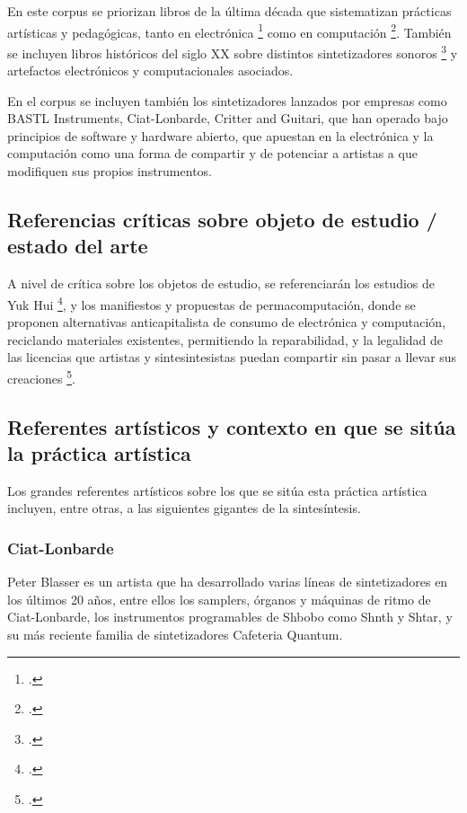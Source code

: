 \documentclass[../proyecto.tex]{subfiles}
\begin{document}
En este corpus se priorizan libros de la última década que sistematizan prácticas artísticas y pedagógicas, tanto en electrónica \footcite{pearson_electronic_2024} como en computación \footcite{erwig_erase_2025}. También se incluyen libros históricos del siglo XX sobre distintos sintetizadores sonoros \footcite{pinch_analog_2002} y artefactos electrónicos y computacionales asociados.

En el corpus se incluyen también los sintetizadores lanzados por empresas como BASTL Instruments, Ciat-Lonbarde, Critter and Guitari, que han operado bajo principios de software y hardware abierto, que apuestan en la electrónica y la computación como una forma de compartir y de potenciar a artistas a que modifiquen sus propios instrumentos.

\subsection{Referencias críticas sobre objeto de estudio / estado del arte}

A nivel de crítica sobre los objetos de estudio, se referenciarán los estudios de Yuk Hui \footcite{hui_arte_2025}, y los manifiestos y propuestas de permacomputación, donde se proponen alternativas anticapitalista de consumo de electrónica y computación, reciclando materiales existentes, permitiendo la reparabilidad, y la legalidad de las licencias que artistas y sintesintesistas puedan compartir sin pasar a llevar sus creaciones \footcite{tozzi_history_2017}.

\subsection{Referentes artísticos y contexto en que se sitúa la práctica artística}

Los grandes referentes artísticos sobre los que se sitúa esta práctica artística incluyen, entre otras, a las siguientes gigantes de la sintesíntesis.

\subsubsection{Ciat-Lonbarde}

Peter Blasser es un artista que ha desarrollado varias líneas de sintetizadores en los últimos 20 años, entre ellos los samplers, órganos y máquinas de ritmo de Ciat-Lonbarde, los instrumentos programables de Shbobo como Shnth y Shtar, y su más reciente familia de sintetizadores Cafeteria Quantum.
\end{document}
